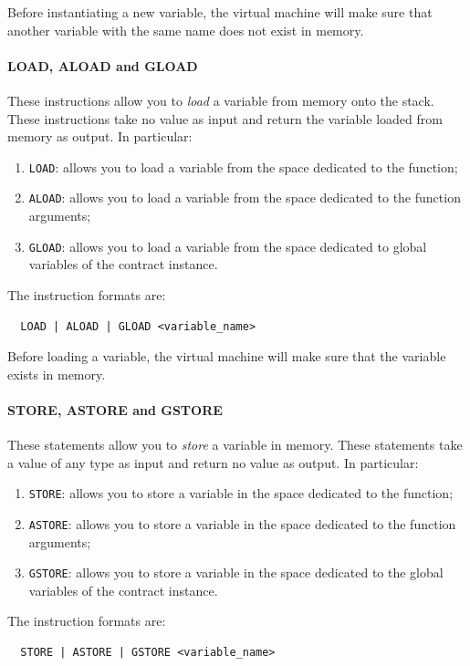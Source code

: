 Before instantiating a new variable, the virtual machine will make sure that another variable with the 
same name does not exist in memory.

\paragraph{LOAD, ALOAD and GLOAD}

These instructions allow you to \textit{load} a variable from memory onto the stack. These instructions 
take no value as input and return the variable loaded from memory as output. In particular:
\begin{enumerate}
  \item \verb|LOAD|: allows you to load a variable from the space dedicated to the function;
  \item \verb|ALOAD|: allows you to load a variable from the space dedicated to the function arguments;
  \item \verb|GLOAD|: allows you to load a variable from the space dedicated to global variables of the 
  contract instance.
\end{enumerate}

The instruction formats are:
\begin{Verbatim}
  LOAD | ALOAD | GLOAD <variable_name>
\end{Verbatim}

Before loading a variable, the virtual machine will make sure that the variable exists in memory.

\paragraph{STORE, ASTORE and GSTORE}

These statements allow you to \textit{store} a variable in memory. These statements take a value of any 
type as input and return no value as output. In particular:
\begin{enumerate}
   \item \verb|STORE|: allows you to store a variable in the space dedicated to the function;
   \item \verb|ASTORE|: allows you to store a variable in the space dedicated to the function arguments;
   \item \verb|GSTORE|: allows you to store a variable in the space dedicated to the global variables of 
   the contract instance.
\end{enumerate}

The instruction formats are:
\begin{Verbatim}
  STORE | ASTORE | GSTORE <variable_name>
\end{Verbatim}

